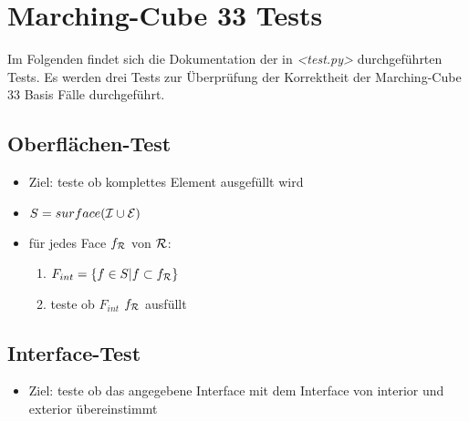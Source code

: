 \documentclass[a4paper, 11pt]{scrartcl}
\newcommand{\file}[1]{\emph{\textless #1\textgreater}}
\begin{document}
\section*{Marching-Cube 33 Tests}

Im Folgenden findet sich die Dokumentation der in \file{test.py} durchgeführten Tests. Es werden drei Tests zur Überprüfung der Korrektheit der Marching-Cube 33 Basis Fälle durchgeführt.
\subsection*{Oberflächen-Test}
\begin{itemize}
\item Ziel: teste ob komplettes Element ausgefüllt wird
\item $S=surface({\cal I}\cup{\cal E})$
\item für jedes Face $f_{\cal R}$ von ${\cal R}$:
  \begin{enumerate}
  \item $F_{int}=\lbrace f\in S| f\subset f_{\cal R}\rbrace$
  \item teste ob $F_{int}$ $f_{\cal R}$ ausfüllt
  \end{enumerate}
\end{itemize}
\subsection*{Interface-Test}
\begin{itemize}
\item Ziel: teste ob das angegebene Interface mit dem Interface von interior und exterior übereinstimmt
\end{itemize}
\end{document}
